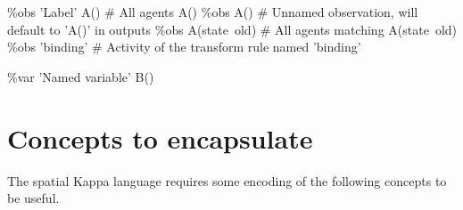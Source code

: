 \begin{kappasource}
\%obs 'Label' A()  # All agents A()
\%obs A()          # Unnamed observation, will default to 'A()' in outputs
\%obs A(state~old) # All agents matching A(state~old)
\%obs 'binding'    # Activity of the transform rule named 'binding'

\%var 'Named variable' B()
\end{kappasource} 



\section{Concepts to encapsulate}

The spatial Kappa language requires some encoding of the following concepts to be useful.

